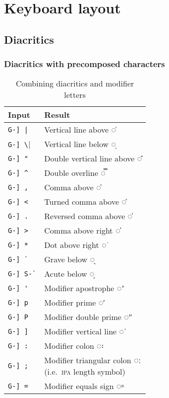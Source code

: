 \documentclass[oneside]{memoir}
\newcommand{\key}{\verb}
\begin{document}
{{\chapter{Keyboard layout}
\label{sec:keyboard_layout}

\section{Diacritics}
\label{sec:diacritics}

\subsection{Diacritics with precomposed characters}
\label{sec:diacritics_with_precomposed_characters}

\begin{wraptable}[31]{r}{5cm}
\centering
\cprotect\caption{Combining diacritics and modifier letters}
\label{tab:misc_diacritics_mappings}
\begin{tabular}{ll}
\toprule
Input & Result \\
\midrule
\key!G-] |!   & Vertical line above ◌̍ \\
\key|G-] \|   & Vertical line below ◌̩ \\
\key|G-] "|   & Double vertical line above ◌̎ \\
\key|G-] ^|   & Double overline ◌̿ \\
\key|G-] ,|   & Comma above ◌̓ \\
\key|G-] <|   & Turned comma above ◌̒ \\
\key|G-] .|   & Reversed comma above  ◌̔ \\
\key|G-] >|   & Comma above right ◌̕ \\
\key|G-] *|   & Dot above right ◌͘ \\
\key|G-] `|   & Grave below ◌̖ \\
\key|G-] S-`| & Acute below ◌̗ \\
\midrule
\key|G-] '|   & Modifier apostrophe ◌ʼ \\
\key|G-] p|   & Modifier prime ◌ʹ \\
\key|G-] P|   & Modifier double prime ◌ʺ \\
\key|G-] ]|   & Modifier vertical line ◌ˈ \\
\key|G-] :|   & Modifier colon ◌꞉ \\
\key|G-] ;|   & \makecell{Modifier triangular colon ◌ː\\(i.e.\ \textsc{ipa} length symbol)} \\
\key|G-] =|   & Modifier equals sign ◌꞊ \\

\end{tabular}
\end{wraptable}}}
\end{document}
